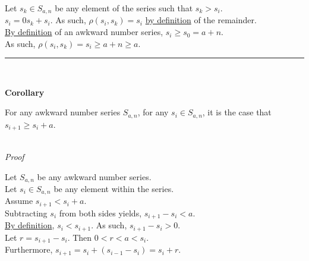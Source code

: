 \documentclass[a4paper,12pt]{article}
\begin{document}
\noindent Let $s_k \in S_{a, n}$ be any element of the series such that $s_k > s_i$.\\

\noindent $s_i = 0s_k + s_i$. As such, $\rho(s_i, s_k) = s_i$ \hyperlink{theorem:remainder_theorem}{by definition} of the remainder.\\

\noindent \hyperlink{definition:awkward_number_series}{By definition} of an awkward number series, $s_i \geq s_0 = a + n$.\\

\noindent As such, $\rho(s_i, s_k) = s_i \geq a + n \geq a$.

\begin{center}
\noindent\rule{8cm}{0.4pt}
\end{center}
\noindent \\






\label{corollary:non_divisibility_of_elements}
\hypertarget{corollary:non_divisibility_of_elements}{}
\begin{tcolorbox}
\textbf{Corollary}

For any awkward number series $S_{a, n}$, for any $s_i \in S_{a, n}$, it is the case that $s_{i + 1} \geq s_i + a$.
\end{tcolorbox}

\noindent \\
\textit{Proof}

\noindent Let $S_{a, n}$ be any awkward number series.\\

\noindent Let $s_i \in S_{a, n}$ be any element within the series.\\

\noindent Assume $s_{i + 1} < s_i + a$.\\

\noindent Subtracting $s_i$ from both sides yields, $s_{i + 1} - s_i < a$.\\

\noindent \hyperlink{definition:awkward_number_series}{By definition}, $s_i < s_{i + 1}$. As such, $s_{i + 1} - s_i > 0$.\\

\noindent Let $r = s_{i + 1} - s_i$. Then $0 < r < a < s_i$.\\

\noindent Furthermore, $s_{i + 1} = s_i + (s_{i - 1} - s_i) = s_i + r$.\\
\end{document}
